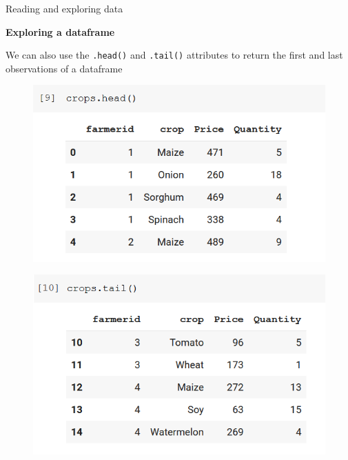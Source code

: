 \documentclass[aspectratio=169]{beamer}
\begin{document}
\begin{frame}{Reading and exploring data}

	\textbf{Exploring a dataframe}

	We can also use the \texttt{.head()} and \texttt{.tail()} attributes to return the first and last observations of a dataframe

	\begin{multicols}{2}

		\begin{figure}
			\includegraphics[width=\linewidth]{img/head.png}
		\end{figure}
		\begin{figure}
			\includegraphics[width=\linewidth]{img/tail.png}
		\end{figure}

	\end{multicols}

\end{frame}
\end{document}
